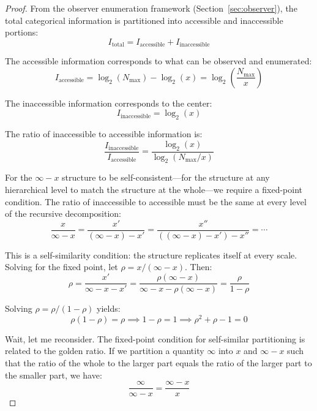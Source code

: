 \documentclass[12pt,a4paper]{article}
\theoremstyle{definition}
\theoremstyle{remark}
\newcommand{\Nmax}{N_{\text{max}}}
\begin{document}
\begin{proof}
From the observer enumeration framework (Section~\ref{sec:observer}), the total categorical information is partitioned into accessible and inaccessible portions:
\begin{equation}
I_{\text{total}} = I_{\text{accessible}} + I_{\text{inaccessible}}
\end{equation}

The accessible information corresponds to what can be observed and enumerated:
\begin{equation}
I_{\text{accessible}} = \log_2(\Nmax) - \log_2(x) = \log_2\left(\frac{\Nmax}{x}\right)
\end{equation}

The inaccessible information corresponds to the center:
\begin{equation}
I_{\text{inaccessible}} = \log_2(x)
\end{equation}

The ratio of inaccessible to accessible information is:
\begin{equation}
\frac{I_{\text{inaccessible}}}{I_{\text{accessible}}} = \frac{\log_2(x)}{\log_2(\Nmax/x)}
\end{equation}

For the $\infty - x$ structure to be self-consistent—for the structure at any hierarchical level to match the structure at the whole—we require a fixed-point condition. The ratio of inaccessible to accessible must be the same at every level of the recursive decomposition:
\begin{equation}
\frac{x}{\infty - x} = \frac{x'}{(\infty - x) - x'} = \frac{x''}{((\infty - x) - x') - x''} = \cdots
\end{equation}

This is a self-similarity condition: the structure replicates itself at every scale. Solving for the fixed point, let $\rho = x / (\infty - x)$. Then:
\begin{equation}
\rho = \frac{x'}{\infty - x - x'} = \frac{\rho(\infty - x)}{\infty - x - \rho(\infty - x)} = \frac{\rho}{1 - \rho}
\end{equation}

Solving $\rho = \rho/(1 - \rho)$ yields:
\begin{equation}
\rho(1 - \rho) = \rho \implies 1 - \rho = 1 \implies \rho^2 + \rho - 1 = 0
\end{equation}

Wait, let me reconsider. The fixed-point condition for self-similar partitioning is related to the golden ratio. If we partition a quantity $\infty$ into $x$ and $\infty - x$ such that the ratio of the whole to the larger part equals the ratio of the larger part to the smaller part, we have:
\begin{equation}
\frac{\infty}{\infty - x} = \frac{\infty - x}{x}
\end{equation}


\end{proof}
\end{document}
